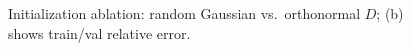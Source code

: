 \documentclass{article}
\begin{document}
\begin{figure}[h]
  \centering
  \caption{Initialization ablation: random Gaussian vs.\ orthonormal $D$; (b) shows train/val relative error.}
  \label{fig:init_ablation}
\end{figure}
\end{document}
